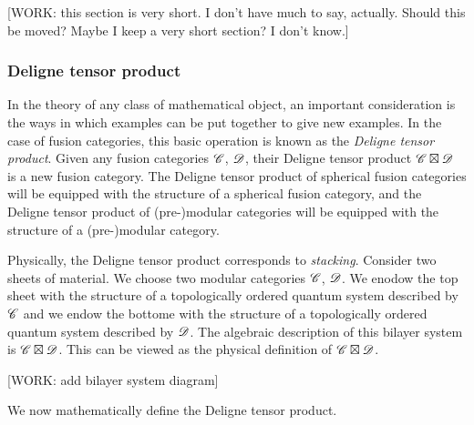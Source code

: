 [WORK: this section is very short. I don't have much to say, actually. Should this be moved? Maybe I keep a very short section? I don't know.]

\subsubsection{Deligne tensor product}

In the theory of any class of mathematical object, an important consideration is the ways in which examples can be put together to give new examples. In the case of fusion categories, this basic operation is known as the \textit{Deligne tensor product}. Given any fusion categories $\mathscr{C}$, $\mathscr{D}$, their Deligne tensor product $\mathscr{C}\boxtimes \mathscr{D}$ is a new fusion category. The Deligne tensor product of spherical fusion categories will be equipped with the structure of a spherical fusion category, and the Deligne tensor product of (pre-)modular categories will be equipped with the structure of a (pre-)modular category.

Physically, the Deligne tensor product corresponds to \textit{stacking}. Consider two sheets of material. We choose two modular categories $\mathscr{C}$, $\mathscr{D}$. We enodow the top sheet with the structure of a topologically ordered quantum system described by $\mathscr{C}$ and we endow the bottome with the structure of a topologically ordered quantum system described by $\mathscr{D}$. The algebraic description of this bilayer system is $\mathscr{C}\boxtimes \mathscr{D}$. This can be viewed as the physical definition of $\mathscr{C}\boxtimes \mathscr{D}$.

[WORK: add bilayer system diagram]

We now mathematically define the Deligne tensor product.


